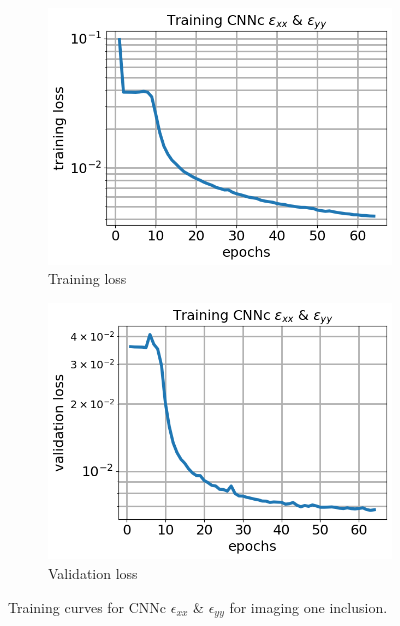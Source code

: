 \documentclass[12pt]{article}
\newcommand{\nhgfigheight}{4.0cm}
\begin{document}
%
\begin{figure}[h]
  \centering
  \begin{subfigure}[b]{0.45\linewidth}
    \includegraphics[totalheight=\nhgfigheight]{Figures/final1c/training/exxeyy/field_strainxxyy_plot_loss.png}
    \caption{Training loss}
  \end{subfigure}
  \begin{subfigure}[b]{0.45\linewidth}
    \includegraphics[totalheight=\nhgfigheight]{Figures/final1c/training/exxeyy/field_strainxxyy_plot_val_loss.png}
    \caption{Validation loss}
  \end{subfigure}
\caption{\label{fig:oneinctanh:trainexxeyy} Training curves for CNNc $\epsilon_{xx}$ \& $\epsilon_{yy}$ for imaging one inclusion.}
\end{figure}
\end{document}
